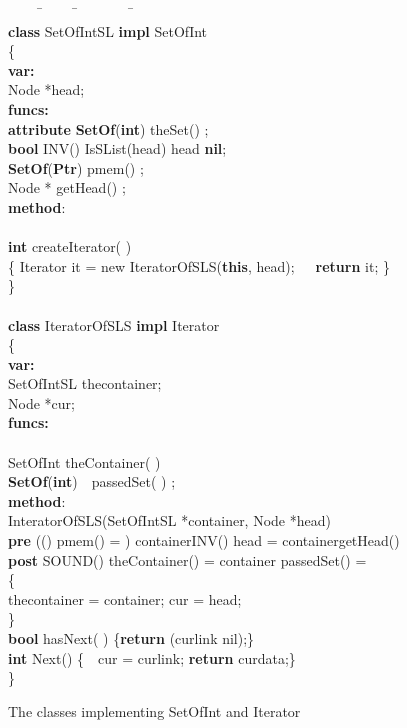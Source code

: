\documentclass[fleqn]{llncs}
\begin{document}
\begin{figure}
\begin{center}
\begin{boxedminipage}{1.0\textwidth}
{\scriptsize
\begin{tabbing}
\ \ \ \ \=\ \ \ \ \ \=\ \ \ \ \ \ \ \ \=\ \ \ \ \=\\
\textbf{class} SetOfIntSL \textbf{impl} SetOfInt\\
\{\\
\textbf{var:}\\
    \>Node *head;\\
\textbf{funcs:}\\
    \>\textbf{attribute} \textbf{SetOf}(\textbf{int}) theSet() ;\\
    \>\textbf{bool}  INV()  IsSList(head)  head  \textbf{nil};\\
    \>\textbf{SetOf}(\textbf{Ptr}) pmem() ;\\
    \>Node * getHead() ;\\
\textbf{method}:\\
    \>  \>  \>\\
    \>\textbf{int} createIterator( )\\
    \>\{ \>Iterator it = new IteratorOfSLS(\textbf{this}, head);\ \ \ \textbf{return} it; \}\\
\}\\
\\
\textbf{class} IteratorOfSLS \textbf{impl} Iterator\\
\{\\
\textbf{var:}\\
    \>SetOfIntSL thecontainer;\\
    \>Node *cur;\\
\textbf{funcs:}\\
\>\\
    \>SetOfInt  theContainer( ) \\
    \>\textbf{SetOf}(\textbf{int})\ \ passedSet( ) ;\\
\textbf{method}:\\
    \>InteratorOfSLS(SetOfIntSL *container, Node *head)\\
\>    \>\textbf{pre} \>  (()  pmem() = )  container{\fldacc}INV()  head = container{\fldacc}getHead()\\
\>    \>\textbf{post}\>  SOUND()  theContainer() = container  passedSet() = \\
\>    \>\{\\
\>    \>  \>thecontainer = container; cur = head;\\
\>    \>\}\\
    \>\textbf{bool}    hasNext( ) \{\textbf{return} (cur{\fldacc}link  nil);\}\\
    \>\textbf{int}    Next() \{\ \ cur = cur{\fldacc}link; \textbf{return} cur{\fldacc}data;\}\\
\}\\
\end{tabbing}
}
\end{boxedminipage}
\end{center}
\caption{The classes implementing SetOfInt and Iterator}\label{FIG-ITERATOR-IMP}
\end{figure}
\end{document}
